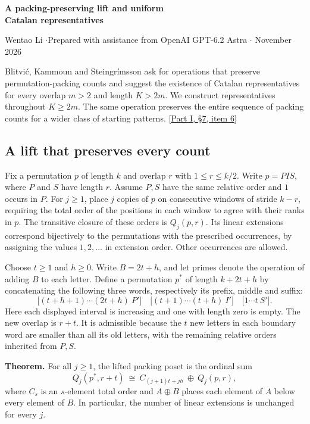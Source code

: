 \documentclass[11pt]{article}
\begin{document}
\begin{center}{\Large\bfseries A packing-preserving lift and uniform\\ Catalan representatives}\par
\small Wentao Li \enspace$\cdot$\enspace Prepared with assistance from OpenAI GPT-6.2 Astra \enspace$\cdot$ November 2026\end{center}

Blitvi\'c, Kammoun and Steingr\'imsson ask for operations that preserve permutation-packing counts and suggest the existence of Catalan representatives for every overlap $m>2$ and length $K>2m$. We construct representatives throughout $K\ge 2m$. The same operation preserves the entire sequence of packing counts for a wider class of starting patterns. [\href{https://arxiv.org/html/2610.29846v1\#S7}{Part I, \S7, item 6}]

\subsection*{A lift that preserves every count}
Fix a permutation $p$ of length $k$ and overlap $r$ with $1\le r\le k/2$. Write $p=PIS$, where $P$ and $S$ have length $r$. Assume $P,S$ have the same relative order and $1$ occurs in $P$. For $j\ge1$, place $j$ copies of $p$ on consecutive windows of stride $k-r$, requiring the total order of the positions in each window to agree with their ranks in $p$. The transitive closure of these orders is $Q_j(p,r)$. Its linear extensions correspond bijectively to the permutations with the prescribed occurrences, by assigning the values $1,2,\ldots$ in extension order. Other occurrences are allowed.

Choose $t\ge1$ and $h\ge0$. Write $B=2t+h$, and let primes denote the operation of adding $B$ to each letter. Define a permutation $p^*$ of length $k+2t+h$ by concatenating the following three words, respectively its prefix, middle and suffix:
\[
 \big[(t+h+1)\cdots(2t+h)\ P'\big]\quad
 \big[(t+1)\cdots(t+h)\ I'\big]\quad
 \big[1\cdots t\ S'\big].
\]
Here each displayed interval is increasing and one with length zero is empty. The new overlap is $r+t$. It is admissible because the $t$ new letters in each boundary word are smaller than all its old letters, with the remaining relative orders inherited from $P,S$.

\textbf{Theorem.} For all $j\ge1$, the lifted packing poset is the ordinal sum
\[
 Q_j(p^*,r+t)\ \cong\ C_{(j+1)t+jh}\ \oplus\ Q_j(p,r),
\]
where $C_s$ is an $s$-element total order and $A\oplus B$ places each element of $A$ below every element of $B$. In particular, the number of linear extensions is unchanged for every $j$.
\end{document}
